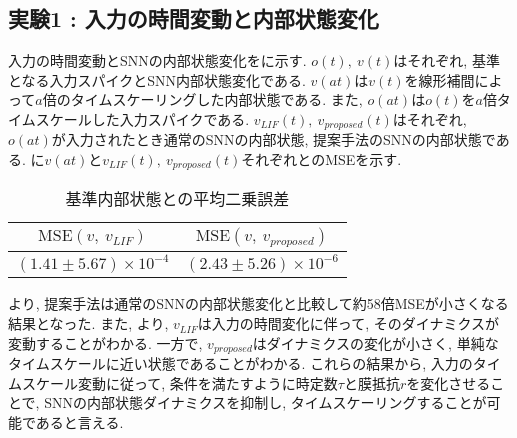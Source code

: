 \makeatletter %
\subsection{実験1 : 入力の時間変動と内部状態変化}

入力の時間変動とSNNの内部状態変化をに示す.
$o(t), ~ v(t)$はそれぞれ, 基準となる入力スパイクとSNN内部状態変化である.
$v(at)$は$v(t)$を線形補間によって$a$倍のタイムスケーリングした内部状態である.
また, $o(at)$は$o(t)$を$a$倍タイムスケールした入力スパイクである.
$v_{LIF}(t),~ v_{proposed}(t)$はそれぞれ, $o(at)$が入力されたとき通常のSNNの内部状態, 提案手法のSNNの内部状態である.
に$v(at)$と$v_{LIF}(t),~ v_{proposed}(t)$それぞれとのMSEを示す.
\begin{table}[htb]
    \centering
    \caption{基準内部状態との平均二乗誤差}
    \label{sec4:tab:exp1}
    \begin{tabular}{cc}
        \hline
        $\mathbf{\mathrm{MSE}(\mathit{v,\ v_{LIF}})}$ & $\mathbf{\mathrm{MSE}(\mathit{v,\ v_{proposed}})}$\\
        \hline
        $(1.41 \pm 5.67) \times 10^{-4}$   & $(2.43\pm 5.26 )\times 10^{-6}$
    \end{tabular}
\end{table}

\textbf{}より, 提案手法は通常のSNNの内部状態変化と比較して約58倍MSEが小さくなる結果となった.
また, \textbf{}より, $v_{LIF}$は入力の時間変化に伴って, そのダイナミクスが変動することがわかる.
一方で, $v_{proposed}$はダイナミクスの変化が小さく, 単純なタイムスケールに近い状態であることがわかる.
これらの結果から, 入力のタイムスケール変動に従って, 条件を満たすように時定数$\tau$と膜抵抗$r$を変化させることで, SNNの内部状態ダイナミクスを抑制し, タイムスケーリングすることが可能であると言える.